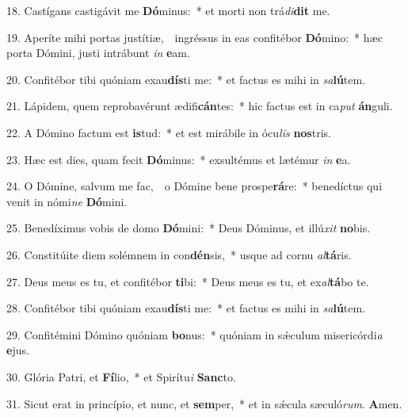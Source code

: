 18. Castígans castigávit me \textbf{Dó}minus:~* et morti non trá\textit{di}\textbf{dit} me.

19. Aperíte mihi portas justítiæ,~\GreDagger\ ingréssus in eas confitébor \textbf{Dó}mino:~* hæc porta Dómini, justi intrábunt \textit{in} \textbf{e}am.

20. Confitébor tibi quóniam exau\textbf{dís}ti me:~* et factus es mihi in \textit{sa}\textbf{lú}tem.

21. Lápidem, quem reprobavérunt ædifi\textbf{cán}tes:~* hic factus est in ca\textit{put} \textbf{án}guli.

22. A Dómino factum est \textbf{is}tud:~* et est mirábile in ócu\textit{lis} \textbf{nos}tris.

23. Hæc est dies, quam fecit \textbf{Dó}minus:~* exsultémus et lætémur \textit{in} \textbf{e}a.

24. O Dómine, salvum me fac,~\GreDagger\ o Dómine bene prospe\textbf{rá}re:~* benedíctus qui venit in nómi\textit{ne} \textbf{Dó}mini.

25. Benedíximus vobis de domo \textbf{Dó}mini:~* Deus Dóminus, et illú\textit{xit} \textbf{no}bis.

26. Constitúite diem solémnem in con\textbf{dén}sis,~* usque ad cornu \textit{al}\textbf{tá}ris.

27. Deus meus es tu, et confitébor \textbf{ti}bi:~* Deus meus es tu, et ex\textit{al}\textbf{tá}bo te.

28. Confitébor tibi quóniam exau\textbf{dís}ti me:~* et factus es mihi in \textit{sa}\textbf{lú}tem.

29. Confitémini Dómino quóniam \textbf{bo}nus:~* quóniam in s\'{\ae}culum misericórdi\textit{a} \textbf{e}jus.

30. Glória Patri, et \textbf{Fí}lio,~* et Spirítu\textit{i} \textbf{Sanc}to.

31. Sicut erat in princípio, et nunc, et \textbf{sem}per,~* et in s\'{\ae}cula sæculó\textit{rum}. \textbf{A}men.